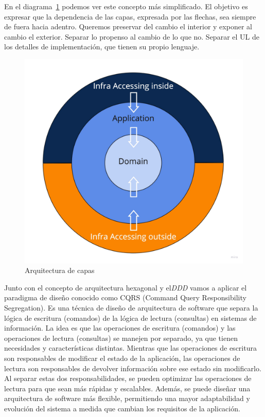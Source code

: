 En el diagrama~\cref{fig:layers} podemos ver este concepto más simplificado. El objetivo es expresar que la dependencia de las capas, expresada por las flechas, sea siempre de fuera hacia adentro. Queremos preservar del cambio el interior y exponer al cambio el exterior. Separar lo propenso al cambio de lo que no. Separar el UL de los detalles de implementación, que tienen su propio lenguaje.

\begin{figure}[H]
    \centering
    \includegraphics[height=0.3\textheight]{./part/Proyecto_ejecutivo/memoria_descriptiva/infoPreviaAntecedentes/img/PFM - Layer}
    \caption{Arquitectura de capas}\label{fig:layers}
\end{figure}

Junto con el concepto de arquitectura hexagonal y el\textit{DDD} vamos a aplicar el paradigma de diseño conocido como \gls{CQRS} (Command Query Responsibility Segregation). Es una técnica de diseño de arquitectura de software que separa la lógica de escritura (comandos) de la lógica de lectura (consultas) en sistemas de información. La idea es que las operaciones de escritura (comandos) y las operaciones de lectura (consultas) se manejen por separado, ya que tienen necesidades y características distintas. Mientras que las operaciones de escritura son responsables de modificar el estado de la aplicación, las operaciones de lectura son responsables de devolver información sobre ese estado sin modificarlo. Al separar estas dos responsabilidades, se pueden optimizar las operaciones de lectura para que sean más rápidas y escalables. Además, se puede diseñar una arquitectura de software más flexible, permitiendo una mayor adaptabilidad y evolución del sistema a medida que cambian los requisitos de la aplicación.

